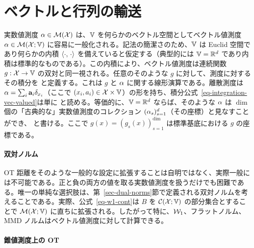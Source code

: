 \section{ベクトルと行列の輸送}

実数値測度 $\alpha \in \mathcal{M}(\mathcal{X})$ は、$\mathbb{V}$ を何らかのベクトル空間としてベクトル値測度 $\alpha \in \mathcal{M}(\mathcal{X};\mathbb{V})$ に容易に一般化される。記法の簡潔さのため、$\mathbb{V}$ は Euclid 空間であり何らかの内積 $\langle \cdot,\,\cdot\rangle$ を備えていると仮定する（典型的には $\mathbb{V}=\mathbb{R}^d$ であり内積は標準的なものである）。この内積により、ベクトル値測度は連続関数 $g : \mathcal{X} \rightarrow \mathbb{V}$ の双対と同一視される。\ie 任意のそのような $g$ に対して、測度に対するその積分を
と定義する。これは $g$ と $\alpha$ に関する線形演算である。離散測度は $\alpha = \sum_i \mathrm{\textbf{a}}_i \delta_{x_i}$（ここで $(x_i,a_i) \in \mathcal{X} \times \mathbb{V}$）の形を持ち、積分公式~\eqref{eq-integration-vec-valued}は単に
と読める。等価的に、$\mathbb{V}=\mathbb{R}^d$ ならば、そのような $\alpha$ は $\dim$ 個の「古典的な」実数値測度のコレクション $(\alpha_s)_{s=1}^d$（その座標）と見なすことができ、
と書ける。ここで $g(x)=(g_s(x))_{s=1}^\dim$ は標準基底における $g$ の座標である。

\paragraph{双対ノルム}

OT 距離をそのような一般的な設定に拡張することは自明ではなく、実際一般には不可能である。正と負の両方の値を取る実数値測度を扱うだけでも困難である。唯一の単純な選択肢は、第~\ref{sec-dual-norms}節で定義される双対ノルムを考えることである。実際、公式~\eqref{eq-w1-cont}は $B$ を $\mathcal{C}(\mathcal{X};\mathbb{V})$ の部分集合とすることで $\mathcal{M}(\mathcal{X};\mathbb{V})$ に直ちに拡張される。したがって特に、$\mathcal{W}_1$、フラットノルム、MMD ノルムはベクトル値測度に対して計算できる。

\paragraph{錐値測度上の OT}

